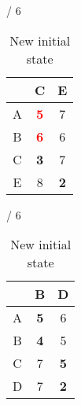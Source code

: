 \documentclass[a4paper, 11 pt, article, accentcolor=tud7b]{tudreport}
\begin{document}
\begin{table}[h]
\begin{subtable}[b]{\textwidth / 6}
\begin{tabular}{| c | c | c |}
	    \hline
	      & C                  & E                  \\ \hline
	    A & \textbf{\textcolor{red}{5}} & 7         \\ \hline
	    B & \textbf{\textcolor{red}{6}} & 6         \\ \hline
	    C & \textbf{3}         & 7                  \\ \hline
	    E & 8                  & \textbf{2}         \\ \hline
	    \end{tabular}
	    \caption{$D^{D}$}
	  \end{subtable}
	  \hfill
	  \begin{subtable}[b]{\textwidth / 6}
	    \begin{tabular}{| c | c | c |}
	    \hline
	      & B                   & D                    \\ \hline
	    A & \textbf{5}          & 6                    \\ \hline
	    B & \textbf{4}          & 5                    \\ \hline
	    C & 7                   & \textbf{5}           \\ \hline
	    D & 7                   & \textbf{2}           \\ \hline
	    \end{tabular}
	    \caption{$D^{E}$}
	  \end{subtable}
	  \caption{New initial state}
	\end{table}
	
\end{document}
